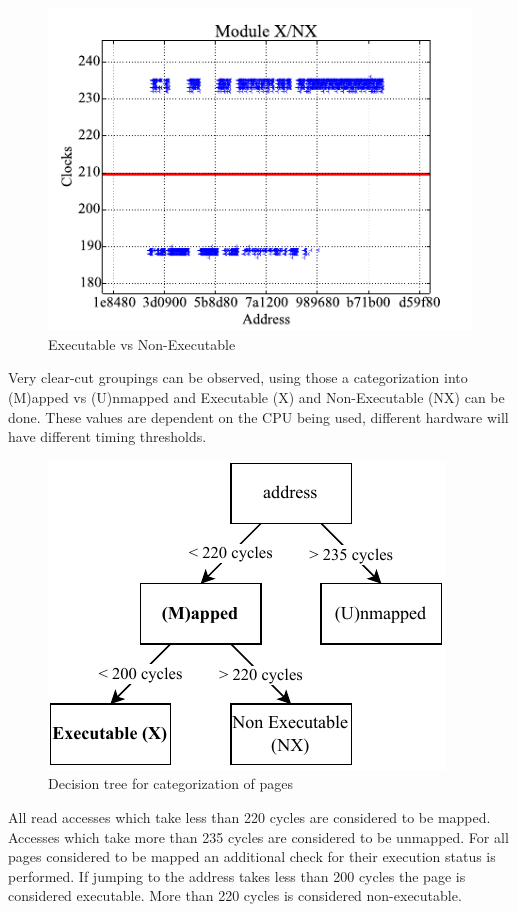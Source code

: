 \begin{figure}[h]
  \begin{center}
    \includegraphics[page=1,width=.4\textwidth]{fig/prebuilt_results_X_NX}
  \end{center}
  \caption{Executable vs Non-Executable}
  \label{fig:timing_x_nx}
\end{figure}

Very clear-cut groupings can be observed, using those a categorization into (M)apped vs (U)nmapped and Executable (X) and Non-Executable (NX) can be done.
These values are dependent on the CPU being used, different hardware will have different timing thresholds.

\begin{figure}[h]
  \begin{center}
    \includegraphics[page=1,width=.4\textwidth]{fig/prebuilt_decision_tree}
  \end{center}
  \caption{Decision tree for categorization of pages}
  \label{fig:decision_tree}
\end{figure}

All read accesses which take less than 220 cycles are considered to be mapped.
Accesses which take more than 235 cycles are considered to be unmapped.
For all pages considered to be mapped an additional check for their execution status is performed.
If jumping to the address takes less than 200 cycles the page is considered executable.
More than 220 cycles is considered non-executable.
